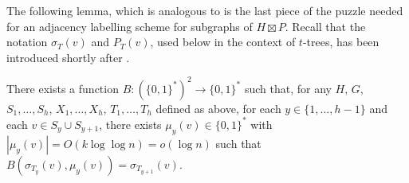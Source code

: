 \documentclass[kpfonts]{patmorin}
\begin{document}
The following lemma, which is analogous to  is the last piece of the puzzle needed for an adjacency labelling scheme for subgraphs of $H\boxtimes P$. Recall that the notation $\sigma_T(v)$ and $P_T(v)$, used below in the context of $t$-trees, has been introduced shortly after .

\begin{lem}
  There exists a function $B:(\{0,1\}^*)^2\to \{0,1\}^*$ such that, for any 
  $H$, $G$, $S_1,\ldots,S_h$, $X_1,\ldots,X_h$, $T_1,\ldots,T_h$ defined as above, for each $y\in\{1,\ldots,h-1\}$ and each $v\in S_y \cup S_{y+1}$, there exists $\mu_y(v)\in\{0,1\}^*$ with $|\mu_y(v)|= O(k\log\log n)=o(\log n)$ such that $B(\sigma_{T_y}(v), \mu_y(v))=\sigma_{T_{y+1}}(v)$.
\end{lem}
\end{document}
